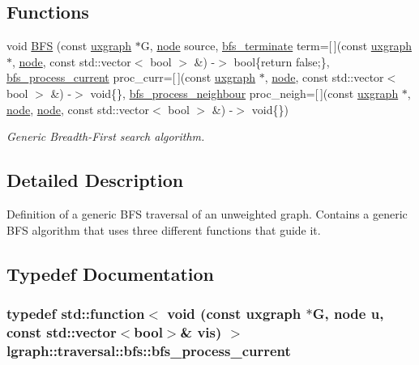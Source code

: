\subsection*{Functions}
\begin{DoxyCompactItemize}
\item 
void \hyperlink{namespacelgraph_1_1traversal_1_1bfs_a08f86eecdea2ffbb82c09163115ec5cc}{B\-F\-S} (const \hyperlink{classlgraph_1_1uxgraph}{uxgraph} $\ast$G, \hyperlink{namespacelgraph_a397169dd66adf725210a30fb7251773e}{node} source, \hyperlink{namespacelgraph_1_1traversal_1_1bfs_a69a129d105f75c4e0093cbd1ae7f53b5}{bfs\-\_\-terminate} term=\mbox{[}$\,$\mbox{]}(const \hyperlink{classlgraph_1_1uxgraph}{uxgraph} $\ast$, \hyperlink{namespacelgraph_a397169dd66adf725210a30fb7251773e}{node}, const std\-::vector$<$ bool $>$ \&) -\/$>$ bool\{return false;\}, \hyperlink{namespacelgraph_1_1traversal_1_1bfs_af0722b6cc643380c87128c791fb74599}{bfs\-\_\-process\-\_\-current} proc\-\_\-curr=\mbox{[}$\,$\mbox{]}(const \hyperlink{classlgraph_1_1uxgraph}{uxgraph} $\ast$, \hyperlink{namespacelgraph_a397169dd66adf725210a30fb7251773e}{node}, const std\-::vector$<$ bool $>$ \&) -\/$>$ void\{\}, \hyperlink{namespacelgraph_1_1traversal_1_1bfs_a4db72f35e69ecdb59756c0258fabb821}{bfs\-\_\-process\-\_\-neighbour} proc\-\_\-neigh=\mbox{[}$\,$\mbox{]}(const \hyperlink{classlgraph_1_1uxgraph}{uxgraph} $\ast$, \hyperlink{namespacelgraph_a397169dd66adf725210a30fb7251773e}{node}, \hyperlink{namespacelgraph_a397169dd66adf725210a30fb7251773e}{node}, const std\-::vector$<$ bool $>$ \&) -\/$>$ void\{\})
\begin{DoxyCompactList}\small\item\em Generic Breadth-\/\-First search algorithm. \end{DoxyCompactList}\end{DoxyCompactItemize}


\subsection{Detailed Description}
Definition of a generic B\-F\-S traversal of an unweighted graph. Contains a generic B\-F\-S algorithm that uses three different functions that guide it. 

\subsection{Typedef Documentation}
\hypertarget{namespacelgraph_1_1traversal_1_1bfs_af0722b6cc643380c87128c791fb74599}{
\subsubsection[{bfs\-\_\-process\-\_\-current}]{\setlength{\rightskip}{0pt plus 5cm}typedef std\-::function$<$ void (const {\bf uxgraph} $\ast$G, {\bf node} u, const std\-::vector$<$bool$>$\& vis) $>$ {\bf lgraph\-::traversal\-::bfs\-::bfs\-\_\-process\-\_\-current}}}\label{namespacelgraph_1_1traversal_1_1bfs_af0722b6cc643380c87128c791fb74599}


